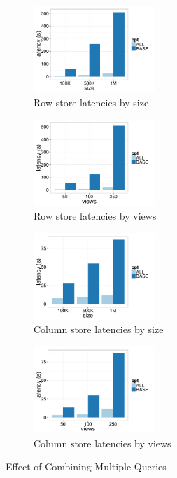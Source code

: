 \begin{figure}[t]
	\centering
	\begin{subfigure}{0.24\linewidth}
		\centering
		\includegraphics[width=4.6cm] {Images/row_all_none_by_size.pdf}
		\caption{Row store latencies by size}
		\label{fig:row_all_none_size}
	\end{subfigure}
	\begin{subfigure}{0.24\linewidth}
		\centering
		\includegraphics[width=4.6cm] {Images/row_all_none_by_views.pdf}
		\caption{Row store latencies by views}
		\label{fig:row_all_none_views}
	\end{subfigure}
	\begin{subfigure}{0.24\linewidth}
		\centering
		\includegraphics[width=4.6cm] {Images/col_all_none_by_size.pdf}
		\caption{Column store latencies by size}
		\label{fig:col_all_none_size}
	\end{subfigure}
	\begin{subfigure}{0.24\linewidth}
		\centering
		\includegraphics[width=4.6cm] {Images/col_all_none_by_views.pdf}
		\caption{Column store latencies by views}
		\label{fig:col_all_none_views}
	\end{subfigure}
	\vspace{-10pt}
	\caption{Effect of Combining Multiple Queries}
	\label{fig:all_opt}
	\vspace{-15pt}
\end{figure}


